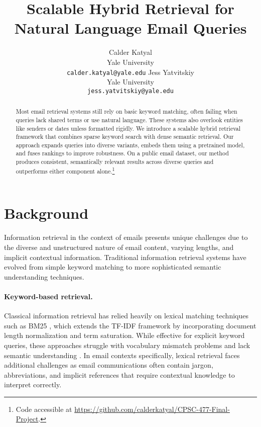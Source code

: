 \documentclass{article}
\title{Scalable Hybrid Retrieval for Natural Language Email Queries}
\author{%
  Calder Katyal \\
  Yale University \\
  \texttt{calder.katyal@yale.edu} 
  \And
  Jess Yatvitskiy \\
  Yale University \\
  \texttt{jess.yatvitskiy@yale.edu}
}
\begin{document}
\maketitle

\begin{abstract}
Most email retrieval systems still rely on basic keyword matching, often failing when queries lack shared terms or use natural language. These systems also overlook entities like senders or dates unless formatted rigidly. We introduce a scalable hybrid retrieval framework that combines sparse keyword search with dense semantic retrieval. Our approach expands queries into diverse variants, embeds them using a pretrained model, and fuses rankings to improve robustness. On a public email dataset, our method produces consistent, semantically relevant results across diverse queries and outperforms either component alone.\footnote{Code accessible at \url{https://github.com/calderkatyal/CPSC-477-Final-Project}.}
\end{abstract}

\section{Background}
Information retrieval in the context of emails presents unique challenges due to the diverse and unstructured nature of email content, varying lengths, and implicit contextual information. Traditional information retrieval systems have evolved from simple keyword matching to more sophisticated semantic understanding techniques.

\paragraph{Keyword-based retrieval.} 
Classical information retrieval has relied heavily on lexical matching techniques such as BM25 \citep{robertson2009probabilistic}, which extends the TF-IDF framework by incorporating document length normalization and term saturation. While effective for explicit keyword queries, these approaches struggle with vocabulary mismatch problems and lack semantic understanding \citep{guo2016deep}. In email contexts specifically, lexical retrieval faces additional challenges as email communications often contain jargon, abbreviations, and implicit references that require contextual knowledge to interpret correctly.
\end{document}
